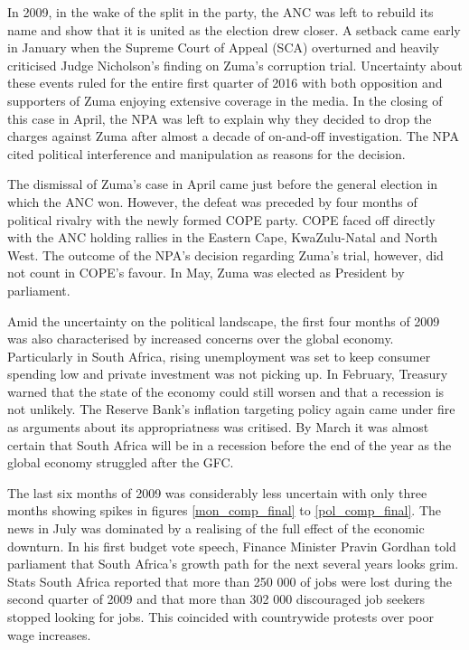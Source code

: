 \documentclass[11pt,preprint, authoryear]{elsarticle}
\numberwithin{equation}{section}
\numberwithin{figure}{section}
\numberwithin{table}{section}
\begin{document}
In 2009, in the wake of the split in the party, the ANC was left to
rebuild its name and show that it is united as the election drew closer.
A setback came early in January when the Supreme Court of Appeal (SCA)
overturned and heavily criticised Judge Nicholson's finding on Zuma's
corruption trial. Uncertainty about these events ruled for the entire
first quarter of 2016 with both opposition and supporters of Zuma
enjoying extensive coverage in the media. In the closing of this case in
April, the NPA was left to explain why they decided to drop the charges
against Zuma after almost a decade of on-and-off investigation. The NPA
cited political interference and manipulation as reasons for the
decision.

The dismissal of Zuma's case in April came just before the general
election in which the ANC won. However, the defeat was preceded by four
months of political rivalry with the newly formed COPE party. COPE faced
off directly with the ANC holding rallies in the Eastern Cape,
KwaZulu-Natal and North West. The outcome of the NPA's decision
regarding Zuma's trial, however, did not count in COPE's favour. In May,
Zuma was elected as President by parliament.

Amid the uncertainty on the political landscape, the first four months
of 2009 was also characterised by increased concerns over the global
economy. Particularly in South Africa, rising unemployment was set to
keep consumer spending low and private investment was not picking up. In
February, Treasury warned that the state of the economy could still
worsen and that a recession is not unlikely. The Reserve Bank's
inflation targeting policy again came under fire as arguments about its
appropriatness was critised. By March it was almost certain that South
Africa will be in a recession before the end of the year as the global
economy struggled after the GFC.

The last six months of 2009 was considerably less uncertain with only
three months showing spikes in figures \ref{mon_comp_final} to
\ref{pol_comp_final}. The news in July was dominated by a realising of
the full effect of the economic downturn. In his first budget vote
speech, Finance Minister Pravin Gordhan told parliament that South
Africa's growth path for the next several years looks grim. Stats South
Africa reported that more than 250 000 of jobs were lost during the
second quarter of 2009 and that more than 302 000 discouraged job
seekers stopped looking for jobs. This coincided with countrywide
protests over poor wage increases.
\end{document}
